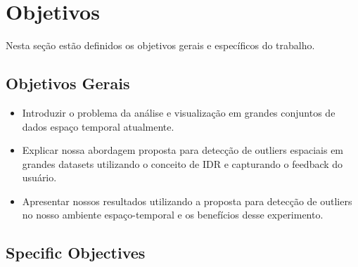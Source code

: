 \section{Objetivos}


Nesta seção estão definidos os objetivos gerais e específicos do trabalho.

\subsection{Objetivos Gerais}

\begin{itemize}
	\item
	      Introduzir o problema da análise e visualização em grandes conjuntos de dados espaço temporal atualmente.
	\item
	      Explicar nossa abordagem proposta para detecção de outliers espaciais em grandes datasets utilizando o conceito de IDR e capturando o feedback do usuário.
	\item
	      Apresentar nossos resultados utilizando a proposta para detecção de outliers no nosso ambiente espaço-temporal e os benefícios desse experimento.

\end{itemize}

\subsection{Specific Objectives}

